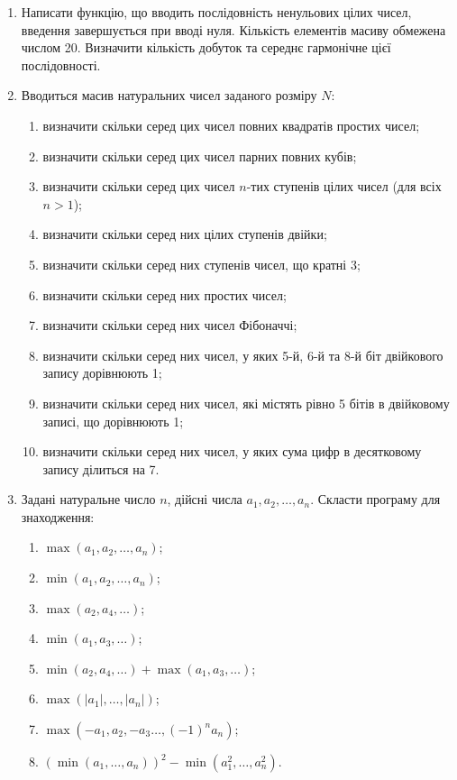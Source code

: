 \documentclass[a5paper,titlepage,openany,twoside,draft]{book_unv}%
\makeatletter
\newcommand{\xslalph}[1]{\expandafter\@xslalph\csname c@#1\endcsname}
\newcommand{\@xslalph}[1]{%
    \ifcase#1\or а\or б\or в\or г\or д\or e\or є\or ж\or з\or i%
    \or й\or к\or л\or м\or н\or о\or п\or р\or с\or т%
    \or у\or ф\or х\or ц\or ч\or ш\or ю\or я\or аа\or бб\or вв%
    \else\@ctrerr\fi%
}
\makeatother
\begin{document}
\begin{enumerate}
\def\labelenumi{\arabic{enumi})}
\setcounter{enumi}{6}
\item
  Написати функцію, що вводить послідовність ненульових цілих чисел,
  введення завершується при вводі нуля. Кількість елементів масиву
  обмежена числом 20. Визначити кількість добуток та середнє гармонічне
  цієї послідовності.
\item
  Вводиться масив натуральних чисел заданого розміру $N$:
\begin{enumerate}[label=\xslalph*)]
\item визначити скільки серед цих чисел повних квадратів простих чисел;
\item визначити скільки серед цих чисел парних повних кубів;
\item визначити скільки серед цих чисел $n$-тих ступенів цілих чисел (для
всіх $n>1$);
\item визначити скільки серед них цілих ступенів двійки;
\item визначити скільки серед них ступенів чисел, що кратні 3;
\item визначити скільки серед них простих чисел;
\item визначити скільки серед них чисел Фібоначчі;
\item визначити скільки серед них чисел, у яких 5-й, 6-й та 8-й біт
двійкового запису дорівнюють 1;
\item визначити скільки серед них чисел, які містять рівно 5 бітів в
двійковому записі, що дорівнюють 1;
\item визначити скільки серед них чисел, у яких сума цифр в десятковому
запису ділиться на 7.
 \end{enumerate}

\item Задані натуральне число \(n\), дійсні числа
\(a_{1},a_{2},\ldots,a_{n}\). Скласти програму для знаходження:
  \begin{multicols}{2}
\begin{enumerate}[label=\xslalph*)]
\item
 \(\max\left( a_{1},a_{2},\ldots,a_{n} \right)\); 
\item
\(\min\left( a_{1},a_{2},\ldots,a_{n} \right)\);
\item \(\max\left( a_{2},a_{4},\ldots \right)\); 
\item
\(\min\left( a_{1},a_{3},\ldots \right)\);
\item
\(\min\left( a_{2},a_{4},\ldots \right) + \max\left( a_{1},a_{3},\ldots \right)\);
\item
\(\max\left( \left| a_{1} \right|,\ldots,\left| a_{n} \right| \right)\);
\item \(\max\left( -a_{1},a_{2}, -a_{3}\ldots,(-1)^{n}a_{n} \right)\);
\item
\(\left( \min\left( a_{1},\ldots,a_{n} \right) \right)^{2} - \min\left( a_{1}^{2},\ldots,a_{n}^{2} \right)\).


\end{enumerate}
\end{multicols}
\end{enumerate}
\end{document}
